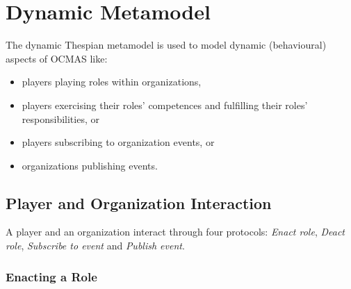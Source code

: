 
\section{Dynamic Metamodel}

The dynamic Thespian metamodel is used to model dynamic (behavioural) aspects of OCMAS like:
\begin{itemize}
	\item players playing roles within organizations,
	\item players exercising their roles' competences and fulfilling their roles' responsibilities, or
	\item players subscribing to organization events, or
	\item organizations publishing events.
\end{itemize}

\subsection{Player and Organization Interaction}

A player and an organization interact through four protocols: \textit{Enact role}, \textit{Deact role}, \textit{Subscribe to event} and \textit{Publish event}.

\subsubsection{Enacting a Role}

